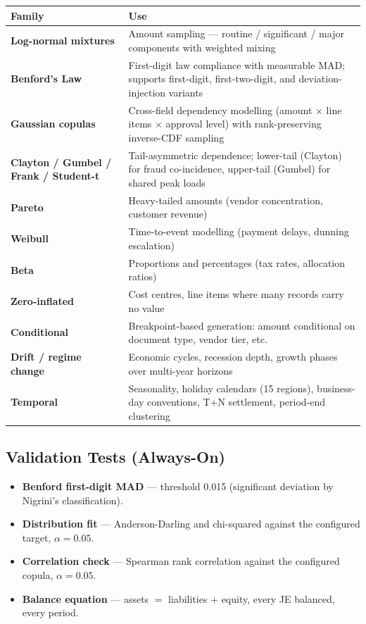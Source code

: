 \documentclass[11pt,a4paper]{article}
\begin{document}
\renewcommand{\arraystretch}{1.2}
\begin{tabularx}{\textwidth}{@{}>{\bfseries\color{brand}}l X@{}}
\toprule
\textbf{Family} & \textbf{Use} \\
\midrule
Log-normal mixtures      & Amount sampling --- routine / significant / major components with weighted mixing \\
Benford's Law            & First-digit law compliance with measurable MAD; supports first-digit, first-two-digit, and deviation-injection variants \\
Gaussian copulas         & Cross-field dependency modelling (amount $\times$ line items $\times$ approval level) with rank-preserving inverse-CDF sampling \\
Clayton / Gumbel / Frank / Student-t & Tail-asymmetric dependence; lower-tail (Clayton) for fraud co-incidence, upper-tail (Gumbel) for shared peak loads \\
Pareto                   & Heavy-tailed amounts (vendor concentration, customer revenue) \\
Weibull                  & Time-to-event modelling (payment delays, dunning escalation) \\
Beta                     & Proportions and percentages (tax rates, allocation ratios) \\
Zero-inflated            & Cost centres, line items where many records carry no value \\
Conditional              & Breakpoint-based generation: amount conditional on document type, vendor tier, etc. \\
Drift / regime change    & Economic cycles, recession depth, growth phases over multi-year horizons \\
Temporal                 & Seasonality, holiday calendars (15 regions), business-day conventions, T+N settlement, period-end clustering \\
\bottomrule
\end{tabularx}

\subsection{Validation Tests (Always-On)}

\begin{itemize}[leftmargin=1.2em, itemsep=3pt]
  \item \textbf{Benford first-digit MAD} --- threshold 0.015 (significant
        deviation by Nigrini's classification).
  \item \textbf{Distribution fit} --- Anderson-Darling and chi-squared
        against the configured target, $\alpha = 0.05$.
  \item \textbf{Correlation check} --- Spearman rank correlation against
        the configured copula, $\alpha = 0.05$.
  \item \textbf{Balance equation} --- assets $=$ liabilities $+$ equity,
        every JE balanced, every period.
\end{itemize}
\end{document}
